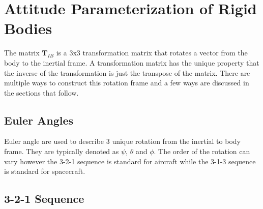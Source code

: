 \documentclass{article}
\begin{document}
\section{Attitude Parameterization of Rigid Bodies}

The matrix $\textbf{T}_{IB}$ is a 3x3 transformation matrix that
rotates a vector from the body to the inertial frame. A transformation
matrix has the unique property that the inverse of the transformation
is just the transpose of the matrix. There are multiple ways to
construct this rotation frame and a few ways are discussed in the
sections that follow. 

\subsection{Euler Angles}\label{s:Euler_Angles}

Euler angle are used to describe 3 unique rotation from the inertial
to body frame. They are typically denoted as $\psi$, $\theta$ and
$\phi$. The order of the rotation can vary however the 3-2-1 sequence
is standard for aircraft while the 3-1-3 sequence is standard for
spacecraft. 

\subsection{3-2-1 Sequence}
\end{document}

